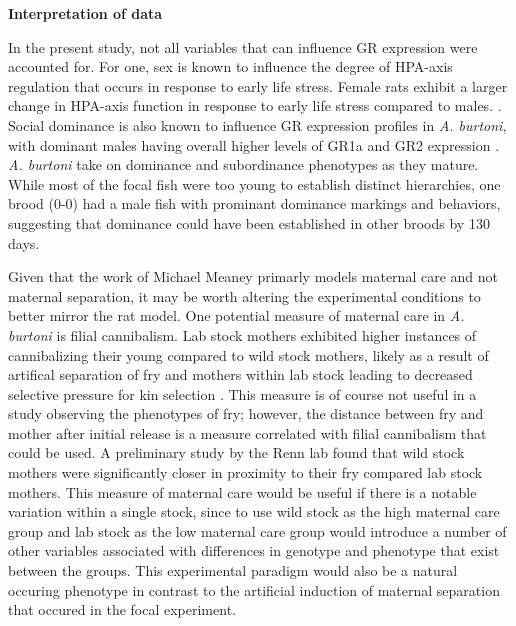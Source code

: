 \documentclass[12pt,twoside]{reedthesis}
\begin{document}
\textbf{Interpretation of data}

In the present study, not all variables that can influence GR expression were
accounted for. For one, sex is known to influence the degree of HPA-axis
regulation that occurs in response to early life stress. Female rats exhibit a
larger change in HPA-axis function in response to early life stress compared to males. \citep{mccormick_sex-specific_1995}. Social dominance is also known to influence
GR expression profiles in \textit{A. burtoni}, with dominant
males having overall higher levels of GR1a and GR2 expression \citep{korzan_social_2014}. \textit{A.
  burtoni} take on dominance and subordinance phenotypes as they mature. While
most of the focal fish were too young to establish distinct hierarchies, one
brood (0-0) had a male fish with prominant dominance markings and behaviors,
suggesting that dominance could have been established in other broods by 130 days. 

Given that the work of Michael Meaney primarly models maternal care and not
maternal separation, it may be worth altering the experimental conditions to
better mirror the rat model. One potential measure of maternal care in
\textit{A. burtoni} is filial cannibalism. Lab stock mothers exhibited higher
instances of cannibalizing their young compared to wild stock mothers, likely as
a result of artifical separation of fry and mothers within lab stock leading to
decreased selective pressure for kin selection \citep{renn_maternal_2009, lonstein_sensory_2002}. This measure is of course not useful
in a study observing the phenotypes of fry; however, the distance between fry and mother after initial
release is a measure correlated with filial cannibalism that could be used. A preliminary study by the
Renn lab found that wild stock mothers were significantly closer in proximity to their
fry compared lab stock mothers. This measure of maternal care would be useful if
there is a notable variation within a single stock, since to use wild stock
as the high maternal care group and lab stock as the low maternal care group
would introduce a number of other variables associated with differences in genotype and phenotype that
exist between the groups. This experimental paradigm would also be a natural
occuring phenotype in contrast to the artificial induction of maternal
separation that occured in the focal experiment. 
\end{document}
